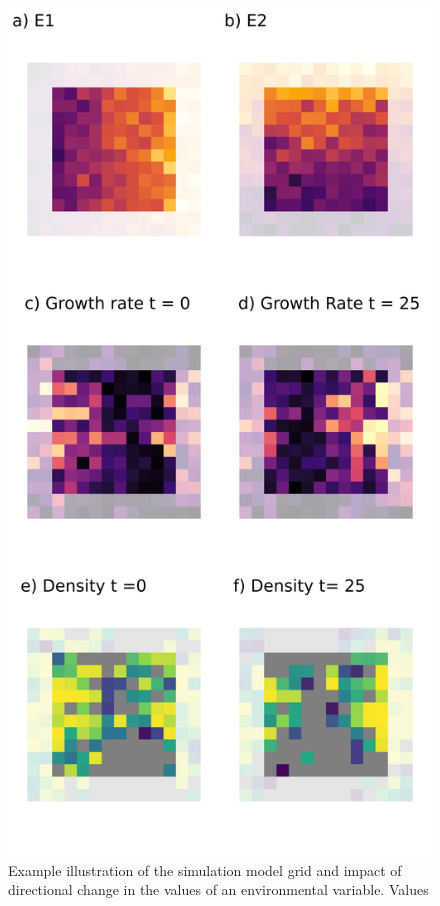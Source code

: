 \documentclass[
]{article}
\begin{document}
\begin{figure}
\centering
\includegraphics[width=\textwidth,height=0.5\textheight]{SimulationMarkdowns/Figures/SimulationExample.png}
\caption{Example illustration of the simulation model grid and impact of
directional change in the values of an environmental variable. Values
}
\end{figure}
\end{document}
